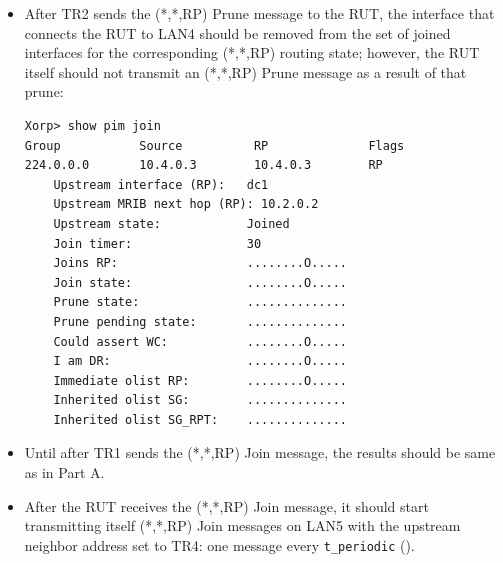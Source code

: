 \documentclass[11pt]{report}
\begin{document}
\begin{itemize}
  \item After TR2 sends the (*,*,RP) Prune message to the RUT, the interface
  that connects the RUT to LAN4 should be removed from the set of joined
  interfaces for the corresponding (*,*,RP) routing state; however, the RUT
  itself should not transmit an (*,*,RP) Prune message as a result of that
  prune:

\begin{verbatim}
Xorp> show pim join 
Group           Source          RP              Flags
224.0.0.0       10.4.0.3        10.4.0.3        RP   
    Upstream interface (RP):   dc1
    Upstream MRIB next hop (RP): 10.2.0.2
    Upstream state:            Joined 
    Join timer:                30
    Joins RP:                  ........O.....
    Join state:                ........O.....
    Prune state:               ..............
    Prune pending state:       ..............
    Could assert WC:           ........O.....
    I am DR:                   ........O.....
    Immediate olist RP:        ........O.....
    Inherited olist SG:        ..............
    Inherited olist SG_RPT:    ..............
\end{verbatim}

\end{itemize}


\begin{itemize}

  \item Until after TR1 sends the (*,*,RP) Join message, the results should be
  same as in Part A.

  \item After the RUT receives the (*,*,RP) Join message, it should start
  transmitting itself (*,*,RP) Join messages on LAN5 with the upstream
  neighbor address set to TR4: one message every \verb=t_periodic=
  ({\PimsmTPeriodic}).

\end{itemize}

\end{document}
